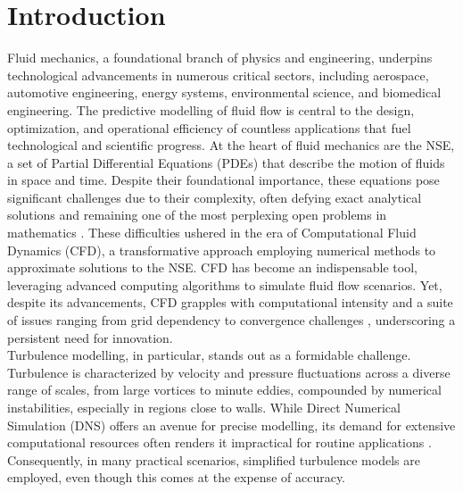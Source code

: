 \chapter{Introduction}
\label{chap:Intro}
Fluid mechanics, a foundational branch of physics and engineering, underpins technological advancements in numerous critical sectors, including aerospace, automotive engineering, energy systems, environmental science, and biomedical engineering. The predictive modelling of fluid flow is central to the design, optimization, and operational efficiency of countless applications that fuel technological and scientific progress. At the heart of fluid mechanics are the \gls{NSE}, a set of Partial Differential Equations (PDEs) that describe the motion of fluids in space and time. Despite their foundational importance, these equations pose significant challenges due to their complexity, often defying exact analytical solutions and remaining one of the most perplexing open problems in mathematics \cite{fefferman2006existence}. These difficulties ushered in the era of Computational Fluid Dynamics (CFD), a transformative approach employing numerical methods to approximate solutions to the \gls{NSE}. CFD has become an indispensable tool, leveraging advanced computing algorithms to simulate fluid flow scenarios. Yet, despite its advancements, CFD grapples with computational intensity and a suite of issues ranging from grid dependency to convergence challenges  \cite{ferziger2002computational}, underscoring a persistent need for innovation.\\
Turbulence modelling, in particular, stands out as a formidable challenge. Turbulence is characterized by velocity and pressure fluctuations across a diverse range of scales, from large vortices to minute eddies, compounded by numerical instabilities, especially in regions close to walls. While Direct Numerical Simulation (DNS) offers an avenue for precise modelling, its demand for extensive computational resources often renders it impractical for routine applications  \cite{moin1998direct}. Consequently, in many practical scenarios, simplified turbulence models are employed, even though this comes at the expense of accuracy.\\
